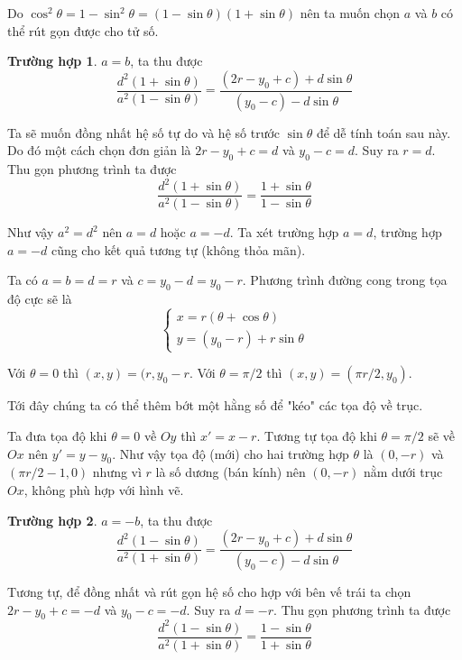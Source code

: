 Do $\cos^2 \theta = 1 - \sin^2 \theta = (1 - \sin \theta)(1 + \sin \theta)$ nên ta muốn chọn $a$ và $b$ có thể rút gọn được cho tử số. 

\textbf{Trường hợp 1}. $a = b$, ta thu được
\begin{equation*}
    \frac{d^2 (1 + \sin \theta)}{a^2 (1 - \sin \theta)} = \frac{(2 r - y_0 + c) + d \sin \theta}{(y_0 - c) - d \sin \theta}
\end{equation*}

Ta sẽ muốn đồng nhất hệ số tự do và hệ số trước $\sin \theta$ để dễ tính toán sau này. Do đó một cách chọn đơn giản là $2 r - y_0 + c = d$ và $y_0 - c = d$. Suy ra $r = d$. Thu gọn phương trình ta được
\begin{equation*}
    \frac{d^2 (1 + \sin \theta)}{a^2 (1 - \sin \theta)} = \frac{1 + \sin \theta}{1 - \sin \theta}
\end{equation*}

Như vậy $a^2 = d^2$ nên $a = d$ hoặc $a = -d$. Ta xét trường hợp $a = d$, trường hợp $a = -d$ cũng cho kết quả tương tự (không thỏa mãn). 

Ta có  $a = b = d = r$ và $c = y_0 - d = y_0 - r$. Phương trình đường cong trong tọa độ cực sẽ là
\begin{equation*}
    \begin{cases}
        x = r(\theta + \cos \theta) \\ y = (y_0 - r) + r \sin \theta
    \end{cases}
\end{equation*}

Với $\theta = 0$ thì $(x, y) = (r, y_0 - r$. Với $\theta = \pi / 2$ thì $(x, y) = (\pi r / 2, y_0)$.

Tới đây chúng ta có thể thêm bớt một hằng số để "kéo" các tọa độ về trục. 

Ta đưa tọa độ khi $\theta = 0$ về $Oy$ thì $x' = x - r$. Tương tự tọa độ khi $\theta = \pi / 2$ sẽ về $Ox$ nên $y' = y - y_0$. Như vậy tọa độ (mới) cho hai trường hợp $\theta$ là $(0, -r)$ và $(\pi r / 2 - 1, 0)$ nhưng vì $r$ là số dương (bán kính) nên $(0, -r)$ nằm dưới trục $Ox$, không phù hợp với hình vẽ.

\textbf{Trường hợp 2}. $a = -b$, ta thu được
\begin{equation*}
    \frac{d^2 (1 - \sin\theta)}{a^2 (1 + \sin\theta)} = \frac{(2r - y_0 + c) + d \sin\theta}{(y_0 - c) - d \sin\theta}
\end{equation*}

Tương tự, để đồng nhất và rút gọn hệ số cho hợp với bên vế trái ta chọn $2r - y_0 + c = -d$ và $y_0 - c = -d$. Suy ra $d = -r$. Thu gọn phương trình ta được
\begin{equation*}
    \frac{d^2 (1 - \sin\theta)}{a^2 (1 + \sin\theta)} = \frac{1 - \sin\theta}{1 + \sin\theta}
\end{equation*}

